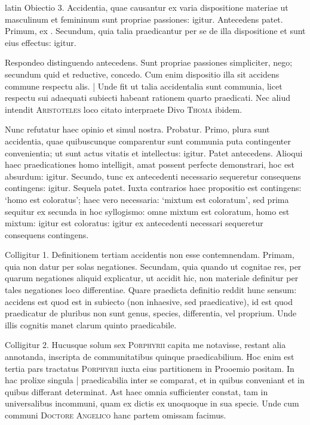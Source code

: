 \begin{otherlanguage*}{latin}
\pstart
  Obiectio 3. Accidentia, quae causantur ex varia dispositione materiae ut masculinum et femininum sunt propriae passiones: igitur. Antecedens patet. Primum, ex . Secundum, quia talia praedicantur per se de illa dispositione et sunt eius effectus: igitur. 
\pend

\pstart
  Respondeo distinguendo antecedens. Sunt propriae passiones simpliciter, nego; secundum quid et reductive, concedo. Cum enim dispositio illa sit accidens commune respectu alis. \textnormal{|}   Unde fit ut talia accidentalia sunt communia, licet respectu sui adaequati subiecti habeant rationem quarto praedicati. Nec aliud intendit \textsc{Aristoteles} loco citato interpraete Divo \textsc{Thoma} ibidem. 
\pend

\pstart
  Nunc refutatur haec opinio et simul nostra. Probatur. Primo, plura sunt accidentia, quae quibuscunque comparentur sunt communia puta contingenter convenientia; ut sunt actus vitatis et intellectus: igitur. Patet antecedens. Alioqui haec praedicationes homo intelligit, amat possent perfecte demonstrari, hoc est absurdum: igitur. Secundo, tunc ex antecedenti necessario sequeretur consequens contingens: igitur. Sequela patet. Iuxta contrarios haec propositio est contingens: `homo est coloratus'; haec vero necessaria: `mixtum est coloratum', sed prima sequitur ex secunda in hoc syllogismo: omne mixtum est coloratum, homo est mixtum: igitur est coloratus: igitur ex antecedenti necessari sequeretur consequens contingens. 
\pend

\pstart
  Colligitur 1. Definitionem tertiam accidentis non esse contemnendam. Primam, quia non datur per solas negationes. Secundam, quia quando ut cognitae res, per quarum negationes aliquid explicatur, ut accidit hic, non materiale definitur per tales negationes loco differentiae. Quare praedicta definitio reddit hunc sensum: accidens est quod est in subiecto (non inhaesive, sed praedicative), id est quod praedicatur de pluribus non sunt genus, species, differentia, vel proprium. Unde illis cognitis manet clarum quinto praedicabile. 
\pend

\pstart
  Colligitur 2. Hucusque solum sex \textsc{Porphyrii} capita me notavisse, restant alia annotanda, inscripta de communitatibus quinque praedicabilium. Hoc enim est tertia pars tractatus \textsc{Porphyrii} iuxta eius partitionem in Prooemio positam. In hac prolixe singula \textnormal{|} praedicabilia inter se comparat, et in quibus conveniant et in quibus differant determinat. Ast haec omnia sufficienter constat, tam in universalibus incommuni, quam ex dictis ex unoquoque in sua specie. Unde cum communi \textsc{Doctore Angelico} hanc partem omissam facimus. 
\pend


\end{otherlanguage*}
